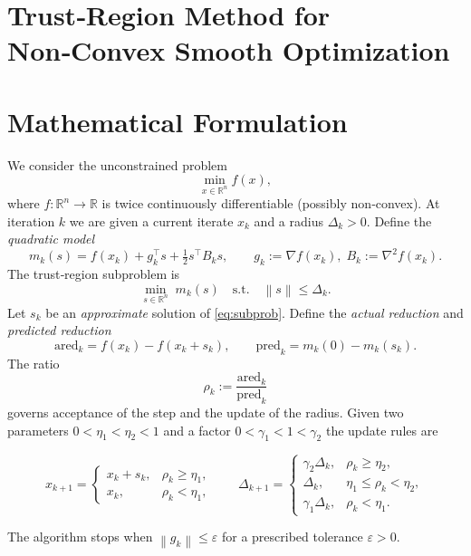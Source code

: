 \documentclass[11pt]{article}
\newcommand{\norm}[1]{\left\lVert#1\right\rVert}
\newcommand{\R}{\mathbb{R}}
\begin{document}
\section*{Trust‑Region Method for Non‑Convex Smooth Optimization}

\section*{Mathematical Formulation}
We consider the unconstrained problem
\[
\min_{x\in\R^{n}} f(x),
\]
where $f:\R^{n}\to\R$ is twice continuously differentiable (possibly non‑convex).  
At iteration $k$ we are given a current iterate $x_{k}$ and a radius $\Delta_{k}>0$.  
Define the \emph{quadratic model}
\[
m_{k}(s)=f(x_{k})+g_{k}^{\top}s+\tfrac12 s^{\top}B_{k}s,\qquad 
g_{k}:=\nabla f(x_{k}),\; B_{k}:=\nabla^{2}f(x_{k}) .
\]
The trust‑region subproblem is
\begin{equation}\label{eq:subprob}
\min_{s\in\R^{n}}\; m_{k}(s)\quad\text{s.t.}\quad \norm{s}\le\Delta_{k}.
\end{equation}
Let $s_{k}$ be an \emph{approximate} solution of \eqref{eq:subprob}.  
Define the \emph{actual reduction} and \emph{predicted reduction}
\[
\text{ared}_{k}=f(x_{k})-f(x_{k}+s_{k}),\qquad 
\text{pred}_{k}=m_{k}(0)-m_{k}(s_{k}).
\]
The ratio
\[
\rho_{k}:=\frac{\text{ared}_{k}}{\text{pred}_{k}}
\]
governs acceptance of the step and the update of the radius.  
Given two parameters $0<\eta_{1}<\eta_{2}<1$ and a factor $0<\gamma_{1}<1<\gamma_{2}$ the update rules are

\[
x_{k+1}= 
\begin{cases}
x_{k}+s_{k}, & \rho_{k}\ge\eta_{1},\\[4pt]
x_{k},      & \rho_{k}<\eta_{1},
\end{cases}
\qquad
\Delta_{k+1}= 
\begin{cases}
\gamma_{2}\Delta_{k}, & \rho_{k}\ge\eta_{2},\\[4pt]
\Delta_{k},           & \eta_{1}\le\rho_{k}<\eta_{2},\\[4pt]
\gamma_{1}\Delta_{k}, & \rho_{k}<\eta_{1}.
\end{cases}
\]

The algorithm stops when $\norm{g_{k}}\le\varepsilon$ for a prescribed tolerance $\varepsilon>0$.
\end{document}
